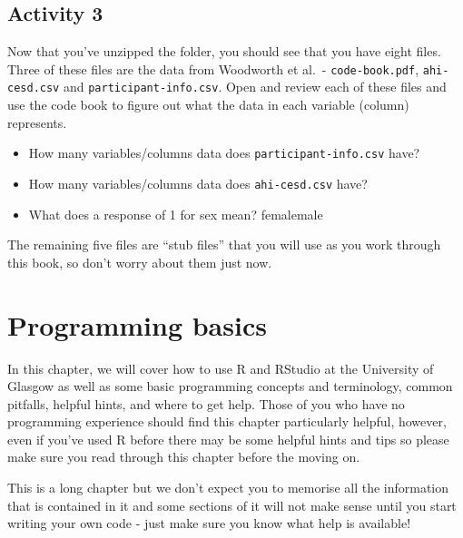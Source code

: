 \documentclass[
  oneside]{book}
\providecommand{\tightlist}{%
  \setlength{\itemsep}{0pt}\setlength{\parskip}{0pt}}
\begin{document}
\hypertarget{activity-3}{%
\section{Activity 3}\label{activity-3}}

Now that you've unzipped the folder, you should see that you have eight files. Three of these files are the data from Woodworth et al.~- \texttt{code-book.pdf}, \texttt{ahi-cesd.csv} and \texttt{participant-info.csv}. Open and review each of these files and use the code book to figure out what the data in each variable (column) represents.

\begin{itemize}
\tightlist
\item
  How many variables/columns data does \texttt{participant-info.csv} have?
\end{itemize}

\begin{itemize}
\tightlist
\item
  How many variables/columns data does \texttt{ahi-cesd.csv} have?
\end{itemize}

\begin{itemize}
\tightlist
\item
  What does a response of 1 for sex mean? femalemale
\end{itemize}

The remaining five files are ``stub files'' that you will use as you work through this book, so don't worry about them just now.

\hypertarget{programming-basics}{%
\chapter{Programming basics}\label{programming-basics}}

In this chapter, we will cover how to use R and RStudio at the University of Glasgow as well as some basic programming concepts and terminology, common pitfalls, helpful hints, and where to get help. Those of you who have no programming experience should find this chapter particularly helpful, however, even if you've used R before there may be some helpful hints and tips so please make sure you read through this chapter before the moving on.

This is a long chapter but we don't expect you to memorise all the information that is contained in it and some sections of it will not make sense until you start writing your own code - just make sure you know what help is available!
\end{document}

